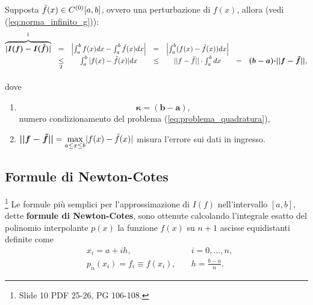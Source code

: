 \begin{definition}
    Supposta $\Tilde{f}(x)\in C^{(0)}[a,b]$, ovvero una perturbazione di $f(x)$, allora (vedi (\ref{eq:norma_infinito_g})):
    \begin{equation*}
        \begin{matrix}
            \overbrace{\boldsymbol{|I(f)-I(\Tilde{f})|}}^{\footnotemark} &=& \left|\int_{a}^{b}f(x)dx-\int_{a}^{b}\Tilde{f}(x)dx\right| &=& \left|\int_{a}^{b}(f(x)-\Tilde{f}(x))dx\right|\\
             &\underset{\footnotemark}{\leq}&\int_{a}^{b}|f(x)-\Tilde{f}(x)|dx&\leq& ||f-\Tilde{f}||\cdot\int_{a}^{b}dx &=&\boldsymbol{(b-a)\cdot}\boldsymbol{||f-\Tilde{f}||},
        \end{matrix}
    \end{equation*}
    
    \addtocounter{footnote}{-1}
    
    
    \noindent dove
    \begin{enumerate}
    	\item \begin{equation}\label{eq:numero_condizionamento_integrale}
    		\boldsymbol{\kappa=(b-a)},
    	\end{equation} 
    	numero condizionamento del problema (\ref{eq:problema_quadratura}),
    	\item $\boldsymbol{||f-\Tilde{f}||}=\underset{a\leq x\leq b}{\max} |f(x)-\Tilde{f}(x)|$ misura l'errore sui dati in ingresso.
    \end{enumerate}
\end{definition}

\subsection{Formule di Newton-Cotes}\label{ssec:formule_N-C}\footnote{Slide 10 PDF 25-26, PG 106-108.}
Le formule più semplici per l'approssimazione di $I(f)$ nell'intervallo $[a,b]$, dette \textbf{formule di Newton-Cotes}, sono ottenute calcolando l'integrale esatto del polinomio interpolante $p(x)$ la funzione $f(x)$ su $n+1$ ascisse equidistanti definite come
\begin{equation}\label{eq:condizione_ascisse_equidistanti_N-C}
    \begin{matrix}
        &x_i=a+ih,&\quad i=0,\hdots,n,\\
        &p_n(x_i)=f_i \equiv f(x_i),&\quad h=\frac{b-a}{n}.
    \end{matrix}
\end{equation}

